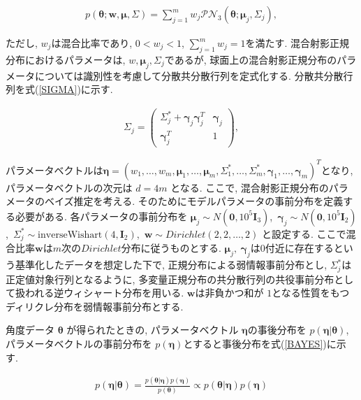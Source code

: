 \documentclass[a4j,12pt]{jarticle}
\begin{document}
\vspace{-2zh}
\begin{eqnarray}
\label{MPNS}
p(\bm \theta;\bm w,\bm \mu, \Sigma) = \sum^m_{j=1} w_j \mathcal{PN}_3(\bm \theta;\bm \mu_j, \Sigma_j),
\end{eqnarray}

\noindent
ただし, $w_j$は混合比率であり, $0 < w_j < 1$, $\sum^m_{j=1} w_j = 1$を満たす. 混合射影正規分布におけるパラメータは, $w, \bm \mu_j, \Sigma_j$であるが, 球面上の混合射影正規分布のパラメータについては識別性を考慮して分散共分散行列を定式化する. 分散共分散行列を式(\ref{SIGMA})に示す.

\begin{eqnarray}
\label{SIGMA}
 \Sigma_j = \left(
    \begin{array}{cc}
      \Sigma^*_j + \bm \gamma_j \bm \gamma_j^T & \bm \gamma_j \\
      \bm \gamma_j^T & 1
    \end{array}
  \right),
\end{eqnarray}

\noindent
パラメータベクトルは$\bm \eta = (w_1, \dots, w_m, \bm \mu_1, \dots, \bm \mu_m, \Sigma^*_1, \dots, \Sigma^*_m, \bm \gamma_1, \dots, \bm \gamma_m)^T$となり, パラメータベクトルの次元は $d = 4m$ となる. ここで, 混合射影正規分布のパラメータのベイズ推定を考える. そのためにモデルパラメータの事前分布を定義する必要がある. 各パラメータの事前分布を $\bm \mu_j \sim N(\bm 0, 10^5 \bm I_3)$,\ $\bm \gamma_j \sim  N(\bm 0, 10^5 \bm I_2)$,\ $\Sigma^*_j \sim \mathrm{inverse Wishart}(4,\bm I_2)$,\ $\bm w \sim Dirichlet(2,2, \dots, 2)$ と設定する. ここで混合比率$\bm w$は$m$次の$Dirichlet$分布に従うものとする. $\bm \mu_j,\ \bm \gamma_j$は$0$付近に存在するという基準化したデータを想定した下で, 正規分布による弱情報事前分布とし, $\Sigma^*_j$は正定値対象行列となるように, 多変量正規分布の共分散行列の共役事前分布として扱われる逆ウィシャート分布を用いる. $\bm w$は非負かつ和が $1$となる性質をもつディリクレ分布を弱情報事前分布とする.

角度データ $\bm \theta$ が得られたときの, パラメータベクトル $\bm \eta$の事後分布を $p(\bm \eta| \bm \theta)$, パラメータベクトルの事前分布を $p(\bm \eta)$とすると事後分布を式(\ref{BAYES})に示す. 

\begin{eqnarray}
\label{BAYES}
p(\bm \eta | \bm \theta) = \frac{p(\bm \theta | \bm \eta) p(\bm \eta)}{p(\bm \theta)} \propto p(\bm \theta | \bm \eta) p(\bm \eta)
\end{eqnarray}
\end{document}
